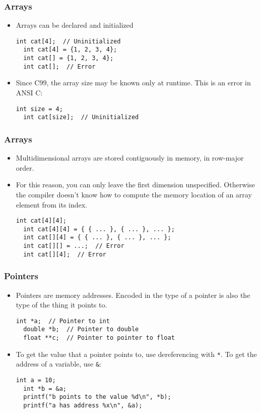 \begin{frame}[fragile]
  \frametitle{Arrays}
  \begin{itemize}
  \item Arrays can be declared and initialized
    \begin{lstlisting}[style=c]
  int cat[4];  // Uninitialized
  int cat[4] = {1, 2, 3, 4};
  int cat[] = {1, 2, 3, 4};
  int cat[];  // Error
    \end{lstlisting}
  \item Since C99, the array size may be known only at runtime. This is an error
    in ANSI C:
    \begin{lstlisting}[style=c]
  int size = 4;
  int cat[size];  // Uninitialized
    \end{lstlisting}
  \end{itemize}
\end{frame}

\begin{frame}[fragile]
  \frametitle{Arrays}
  \begin{itemize}
  \item Multidimensional arrays are stored contiguously in memory, in row-major
    order.
  \item For this reason, you can only leave the first dimension unspecified.
    Otherwise the compiler doesn't know how to compute the memory location of an
    array element from its index.
    \begin{lstlisting}[style=c]
  int cat[4][4];
  int cat[4][4] = { { ... }, { ... }, ... };
  int cat[][4] = { { ... }, { ... }, ... };
  int cat[][] = ...;  // Error
  int cat[][4];  // Error
    \end{lstlisting}
  \end{itemize}
\end{frame}

\begin{frame}[fragile]
  \frametitle{Pointers}
  \begin{itemize}
  \item Pointers are memory addresses. Encoded in the type of a pointer is also
    the type of the thing it points to.
    \begin{lstlisting}[style=c]
  int *a;  // Pointer to int
  double *b;  // Pointer to double
  float **c;  // Pointer to pointer to float
    \end{lstlisting}
  \item To get the value that a pointer points to, use dereferencing with
    \texttt{*}. To get the address of a variable, use \texttt{\&}:
    \begin{lstlisting}[style=c]
  int a = 10;
  int *b = &a;
  printf("b points to the value %d\n", *b);
  printf("a has address %x\n", &a);
    \end{lstlisting}
  \end{itemize}
\end{frame}

